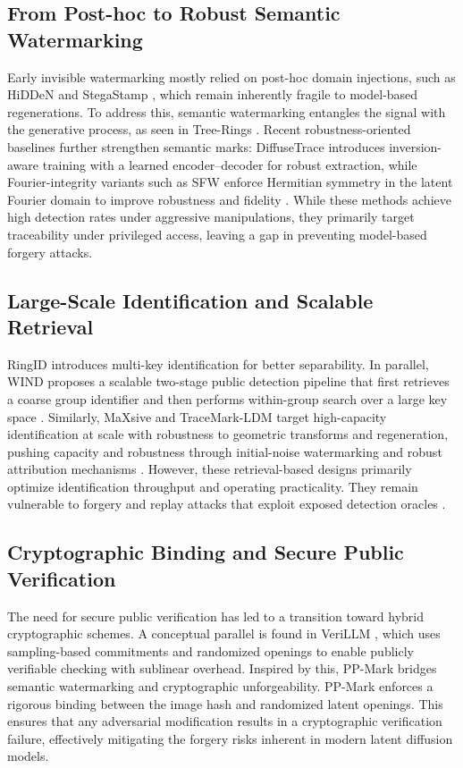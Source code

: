 \documentclass{article}
\theoremstyle{plain}
\theoremstyle{definition}
\theoremstyle{remark}
\begin{document}
\subsection{From Post-hoc to Robust Semantic Watermarking} 
Early invisible watermarking mostly relied on post-hoc domain injections, such as HiDDeN and StegaStamp \cite{zhu2018hidden,tancik2020stegastamp}, which remain inherently fragile to model-based regenerations. To address this, semantic watermarking entangles the signal with the generative process, as seen in Tree-Rings \cite{wen2023treerings}. Recent robustness-oriented baselines further strengthen semantic marks: DiffuseTrace \cite{lei2024diffusetrace} introduces inversion-aware training with a learned encoder--decoder for robust extraction, while Fourier-integrity variants such as SFW enforce Hermitian symmetry in the latent Fourier domain to improve robustness and fidelity \cite{lee2025iccv_sfw}. While these methods achieve high detection rates under aggressive manipulations, they primarily target traceability under privileged access, leaving a gap in preventing model-based forgery attacks.

\subsection{Large-Scale Identification and Scalable Retrieval}
RingID \cite{ci2024ringid} introduces multi-key identification for better separability. In parallel, WIND proposes a scalable two-stage public detection pipeline that first retrieves a coarse group identifier and then performs within-group search over a large key space \cite{arabi2025wind}. Similarly, MaXsive and TraceMark-LDM target high-capacity identification at scale with robustness to geometric transforms and regeneration, pushing capacity and robustness through initial-noise watermarking and robust attribution mechanisms \cite{luo2025tracemarkldm,mao2025maxsive}. However, these retrieval-based designs primarily optimize identification throughput and operating practicality. They remain vulnerable to forgery and replay attacks that exploit exposed detection oracles \cite{jiang2023evading,muller2025blackbox}.

\subsection{Cryptographic Binding and Secure Public Verification}
The need for secure public verification has led to a transition toward hybrid cryptographic schemes. A conceptual parallel is found in VeriLLM \cite{wang2025verillm}, which uses sampling-based commitments and randomized openings to enable publicly verifiable checking with sublinear overhead. Inspired by this, PP-Mark bridges semantic watermarking and cryptographic unforgeability. PP-Mark enforces a rigorous binding between the image hash and randomized latent openings. This ensures that any adversarial modification results in a cryptographic verification failure, effectively mitigating the forgery risks inherent in modern latent diffusion models. 
\end{document}
